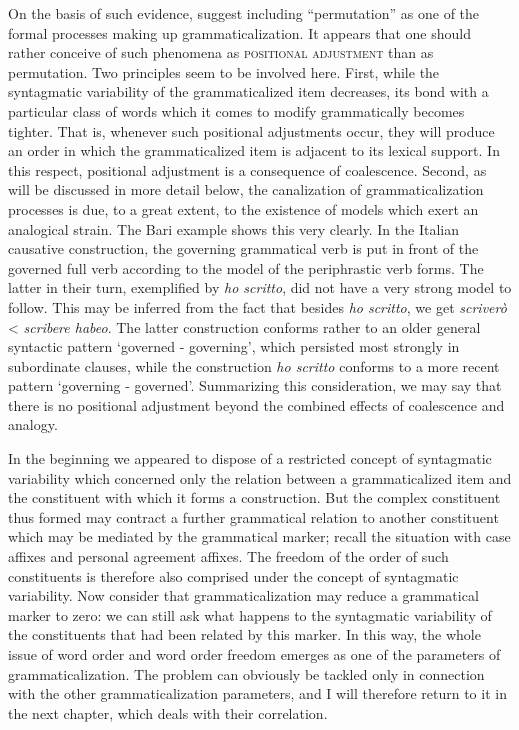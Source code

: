 On the basis of such evidence, \citeauthor{HeineEtAl1984} suggest including ``permutation'' as one of the formal processes making up grammaticalization. It appears that one should rather conceive of such phenomena as \textsc{positional adjustment} than as permutation. Two principles seem to be involved here. First, while the syntagmatic variability of the grammaticalized item decreases, its bond with a particular class of words which it comes to modify grammatically becomes tighter. That is, whenever such positional adjustments occur, they will produce an order in which the grammaticalized item is adjacent to its lexical support. In this respect, positional adjustment is a consequence of coalescence. Second, as will be discussed in more detail below, the canalization of grammaticalization processes is due, to a great extent, to the existence of models which exert an analogical strain. The Bari example shows this very clearly. In the Italian causative construction, the governing grammatical verb is put in front of the governed full verb according to the model of the periphrastic verb forms. The latter in their turn, exemplified by \textit{ho scritto}, did not have a very strong model to follow. This may be inferred from the fact that besides \textit{ho scritto}, we get \textit{scriverò} {\textless} \textit{scribere habeo}. The latter construction conforms rather to an older general syntactic pattern ‘governed - governing’, which persisted most strongly in subordinate clauses, while the construction \textit{ho scritto} conforms to a more recent pattern ‘governing - governed’. Summarizing this consideration, we may say that there is no positional adjustment beyond the combined effects of coalescence and analogy.%

In the beginning we appeared to dispose of a restricted concept of syntagmatic variability which concerned only the relation between a grammaticalized item and the constituent with which it forms a construction. But the complex constituent thus formed may contract a further grammatical relation to another constituent which may be mediated by the grammatical marker; recall the situation with case affixes and personal agreement affixes. The freedom of the order of such constituents is therefore also comprised under the concept of syntagmatic variability. Now consider that grammaticalization may reduce a grammatical marker to zero: we can still ask what happens to the syntagmatic variability of the constituents that had been related by this marker. In this way, the whole issue of word order and word order freedom emerges as one of the parameters of grammaticalization. The problem can obviously be tackled only in connection with the other grammaticalization parameters, and I will therefore return to it in the next chapter, which deals with their correlation.

